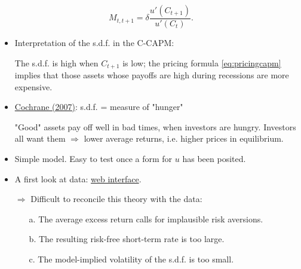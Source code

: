\begin{frame}
\begin{footnotesize}
$$
\boxed{M_{t,t+1}=\delta \dfrac{u'(C_{t+1})}{u'(C_{t})}.}
$$
\begin{itemize}
	\item Interpretation of the s.d.f. in the C-CAPM:
	
	The s.d.f. is high when $C_{t+1}$ is low; the pricing formula \ref{eq:pricingcapm} implies that those assets whose payoffs are high during recessions are more expensive.
	
	\item \href{http://faculty.chicagobooth.edu/john.cochrane/research/papers/financial_and_real_proofs_aug_07.pdf}{Cochrane (2007)}: s.d.f. = measure of "hunger"
	
	"Good" assets pay off well in bad times, when investors are hungry. Investors all want them $\Rightarrow$ lower average returns, i.e. higher prices in equilibrium.
	\item Simple model. Easy to test once a form for $u$ has been posited.
	\item A first look at data: \href{https://jrenne.shinyapps.io/APModels}{web interface}.
	\item[$\Rightarrow$] Difficult to reconcile this theory with the data:
	\begin{itemize}
		\item[a.] The average excess return calls for implausible risk aversions.
		\item[b.] The resulting risk-free short-term rate is too large.
		\item[c.] The model-implied volatility of the s.d.f. is too small.
	\end{itemize}
\end{itemize}
\end{footnotesize}
\end{frame}


